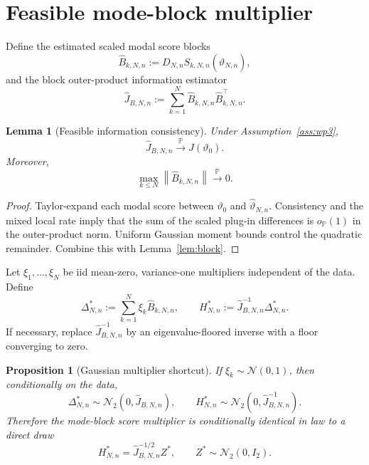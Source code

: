 \documentclass[11pt]{article}
\newtheorem{proposition}[assumption]{Proposition}
\newtheorem{lemma}[assumption]{Lemma}
\theoremstyle{remark}
\newcommand{\Pp}{\mathbb P}
\newcommand{\norm}[1]{\left\lVert #1\right\rVert}
\newcommand{\vhat}{\widehat\vartheta_{N,n}}
\newcommand{\vzero}{\vartheta_0}
\newcommand{\Jhat}{\widehat J_{B,N,n}}
\newcommand{\Dmat}{D_{N,n}}
\begin{document}
\section{Feasible mode-block multiplier}

Define the estimated scaled modal score blocks
\begin{equation}\label{eq:Bhat}
 \widehat B_{k,N,n}
 :=
 \Dmat S_{k,N,n}(\vhat),
\end{equation}
and the block outer-product information estimator
\begin{equation}\label{eq:Jhat}
 \Jhat
 :=
 \sum_{k=1}^N
 \widehat B_{k,N,n}\widehat B_{k,N,n}^\top.
\end{equation}

\begin{lemma}[Feasible information consistency]\label{lem:Jhat}
Under Assumption~\ref{ass:wp3},
\begin{equation}\label{eq:Jhat-cons}
 \Jhat\overset{\Pp}{\longrightarrow}J(\vzero).
\end{equation}
Moreover,
\[
 \max_{k\le N}\norm{\widehat B_{k,N,n}}
 \overset{\Pp}{\longrightarrow}0.
\]
\end{lemma}

\begin{proof}
Taylor-expand each modal score between $\vzero$ and $\vhat$. Consistency and the mixed local rate imply that the sum of the scaled plug-in differences is $o_{\Pp}(1)$ in the outer-product norm. Uniform Gaussian moment bounds control the quadratic remainder. Combine this with Lemma~\ref{lem:block}.
\end{proof}

Let $\xi_1,\ldots,\xi_N$ be iid mean-zero, variance-one multipliers independent of the data. Define
\begin{equation}\label{eq:bootstrap-score}
 \Delta_{N,n}^*
 :=
 \sum_{k=1}^N\xi_k\widehat B_{k,N,n},
 \qquad
 H_{N,n}^*
 :=
 \Jhat^{-1}\Delta_{N,n}^*.
\end{equation}
If necessary, replace $\Jhat^{-1}$ by an eigenvalue-floored inverse with a floor converging to zero.

\begin{proposition}[Gaussian multiplier shortcut]\label{prop:shortcut}
If $\xi_k\sim\mathcal N(0,1)$, then conditionally on the data,
\begin{equation}\label{eq:conditional-normal}
 \Delta_{N,n}^*\sim\mathcal N_2(0,\Jhat),
 \qquad
 H_{N,n}^*\sim\mathcal N_2(0,\Jhat^{-1}).
\end{equation}
Therefore the mode-block score multiplier is conditionally identical in law to a direct draw
\[
 H_{N,n}^*=\Jhat^{-1/2}Z^*,
 \qquad
 Z^*\sim\mathcal N_2(0,I_2).
\]
\end{proposition}
\end{document}

